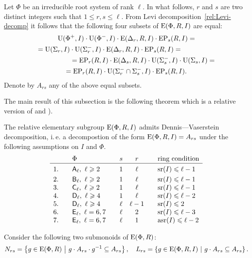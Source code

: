Let $\Phi$ be an irreducible root system of rank $\ell$.
In what follows, $r$ and $s$ are two distinct integers such that $1 \leq r, s \leq \ell$.
From Levi decomposition~\eqref{rel:Levi-decomp} it follows that the following four subsets of $\operatorname{E}(\Phi, R, I)$ are equal:
\begin{multline*}
\operatorname{U}(\Phi^+, I)\cdot \operatorname{U}(\Phi^-, I) \cdot \operatorname{E}(\Delta_r, R, I) \cdot \operatorname{EP}_s(R, I) = \\
= \operatorname{U}(\Sigma_r, I)\cdot \operatorname{U}(\Sigma^-_r, I) \cdot \operatorname{E}(\Delta_r, R, I) \cdot \operatorname{EP}_s(R, I) = \hspace{5em} \\
\hspace{5em} = \operatorname{EP}_r(R, I) \cdot \operatorname{E}(\Delta_s, R, I) \cdot \operatorname{U}(\Sigma_s^-, I)\cdot \operatorname{U}(\Sigma_s, I) = \\
= \operatorname{EP}_r(R, I) \cdot \operatorname{U}(\Sigma^-_r \cap \Sigma^-_s, I) \cdot \operatorname{EP}_s(R, I).
\end{multline*}
Denote by $A_{rs}$ any of the above equal subsets.

The main result of this subsection is the following theorem which is a relative version of \cite[Lemma~2.1]{ST76} and \cite[Theorem~2.5]{St78}).
\begin{thm}\label{thm:DennisVaserstein}
The relative elementary subgroup $\operatorname{E}(\Phi, R, I)$ admits Dennis---Vaserstein decomposition, i.\,e. a decompostion of the form $\operatorname{E}(\Phi, R, I) = A_{rs}$ under the following assumptions on $I$ and $\Phi$.
\[\begin{array}{l@{\qquad}l@{\qquad}c@{\quad}c@{\qquad}l}
   & \Phi                                 & s    & r      & \text{ring condition} \\ \hline\vphantom{\Bigl(}
1. & \rA_\ell,\ \ell\geqslant 2            & 1    & \ell   & \sr(I) \leqslant \ell-1 \\    
2. & \rB_\ell,\ \ell\geqslant 2            & 1    & \ell   & \sr(I) \leqslant \ell-1 \\
3. & \rC_\ell,\ \ell \geqslant 2          & 1    & \ell   & \sr(I) \leqslant \ell-1 \\
4. & \rD_\ell,\ \ell\geqslant 4           & 1    & \ell   & \sr(I) \leqslant \ell-2 \\ 
5. & \rD_\ell,\ \ell\geqslant 4           & \ell & \ell-1 & \sr(I) \leqslant 2      \\
6. & \rE_\ell,\ \ell=6,7                  & \ell & 2      & \sr(I) \leqslant \ell-3 \\ 
7. & \rE_\ell,\ \ell=6,7                  & \ell & 1      & \asr(I)\leqslant \ell-2 \end{array}\]
\end{thm}
Consider the following two submonoids of $\operatorname{E}(\Phi, R)$:
\[ N_{rs} = \left\{ g\in \operatorname{E}(\Phi, R)\ \middle|\ g \cdot A_{rs} \cdot g^{-1} \subseteq A_{rs} \right\}, \quad
   L_{rs}=  \left\{ g\in \operatorname{E}(\Phi, R, I)\ \middle|\ g \cdot A_{rs} \subseteq A_{rs} \right\}. \]


